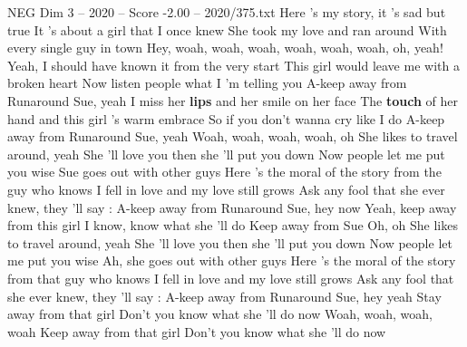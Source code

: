 \begin{textsample}{NEG Dim 3 – 2020 – Score -2.00 – 2020/375.txt}  \label{ex:f3_neg_033}
Here 's my story, it 's sad but true It 's about a girl that I once knew She took my love and ran around With every single guy in town Hey, woah, woah, woah, woah, woah, woah, oh, yeah!
Yeah, I should have known it from the very start This girl would leave me with a broken heart Now listen people what I 'm telling you A-keep away from Runaround Sue, yeah I miss her \textbf{lips} and her smile on her face The \textbf{touch} of her hand and this girl 's warm embrace So if you don't wanna cry like I do A-keep away from Runaround Sue, yeah Woah, woah, woah, woah, oh She likes to travel around, yeah She 'll love you then she 'll put you down Now people let me put you wise Sue goes out with other guys Here 's the moral of the story from the guy who knows I fell in love and my love still grows Ask any fool that she ever knew, they 'll say : A-keep away from Runaround Sue, hey now Yeah, keep away from this girl I know, know what she 'll do Keep away from Sue Oh, oh She likes to travel around, yeah She 'll love you then she 'll put you down Now people let me put you wise Ah, she goes out with other guys Here 's the moral of the story from that guy who knows I fell in love and my love still grows Ask any fool that she ever knew, they 'll say : A-keep away from Runaround Sue, hey yeah Stay away from that girl Don't you know what she 'll do now Woah, woah, woah, woah Keep away from that girl Don't you know what she 'll do now

\end{textsample}
